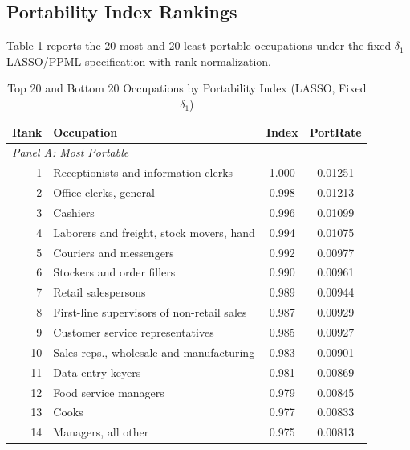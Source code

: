 \documentclass[12pt]{article}
\begin{document}
\subsection{Portability Index Rankings}
\label{sec:results_rankings}

Table \ref{tab:top_bottom} reports the 20 most and 20 least portable occupations under the fixed-$\delta_1$ LASSO/PPML specification with rank normalization.

\begin{table}[H]
\centering
\caption{Top 20 and Bottom 20 Occupations by Portability Index (LASSO, Fixed $\delta_1$)}
\label{tab:top_bottom}
\small
\begin{tabular}{rlcc}
\toprule
\textbf{Rank} & \textbf{Occupation} & \textbf{Index} & \textbf{PortRate} \\
\midrule
\multicolumn{4}{l}{\textit{Panel A: Most Portable}} \\
1  & Receptionists and information clerks          & 1.000 & 0.01251 \\
2  & Office clerks, general                        & 0.998 & 0.01213 \\
3  & Cashiers                                      & 0.996 & 0.01099 \\
4  & Laborers and freight, stock movers, hand       & 0.994 & 0.01075 \\
5  & Couriers and messengers                       & 0.992 & 0.00977 \\
6  & Stockers and order fillers                    & 0.990 & 0.00961 \\
7  & Retail salespersons                           & 0.989 & 0.00944 \\
8  & First-line supervisors of non-retail sales    & 0.987 & 0.00929 \\
9  & Customer service representatives              & 0.985 & 0.00927 \\
10 & Sales reps., wholesale and manufacturing      & 0.983 & 0.00901 \\
11 & Data entry keyers                             & 0.981 & 0.00869 \\
12 & Food service managers                         & 0.979 & 0.00845 \\
13 & Cooks                                         & 0.977 & 0.00833 \\
14 & Managers, all other                           & 0.975 & 0.00813 \\

\end{tabular}
\end{table}
\end{document}

